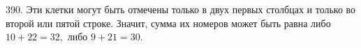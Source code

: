 390. Эти клетки могут быть отмечены только в двух первых столбцах и только во второй или пятой строке. Значит, сумма их номеров может быть равна либо $10+22=32,$ либо $9+21=30.$\\
